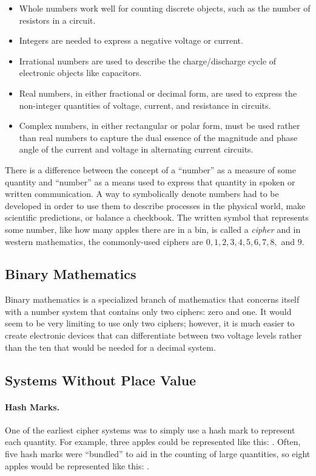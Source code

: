 \begin{itemize}
  \item Whole numbers work well for counting discrete objects, such as the number of resistors in a circuit. 
  \item Integers are needed to express a negative voltage or current. 
  \item Irrational numbers are used to describe the charge/discharge cycle of electronic objects like capacitors.
  \item Real numbers, in either fractional or decimal form, are used to express the non-integer quantities of voltage, current, and resistance in circuits.
  \item Complex numbers, in either rectangular or polar form, must be used rather than real numbers to capture the dual essence of the magnitude and phase angle of the current and voltage in alternating current circuits.
\end{itemize}

There is a difference between the concept of a ``number'' as a measure of some quantity and ``number'' as a means used to express that quantity in spoken or written communication. A way to symbolically denote numbers had to be developed in order to use them to describe processes in the physical world, make scientific predictions, or balance a checkbook. The written symbol that represents some number, like how many apples there are in a bin, is called a \emph{cipher} and in western mathematics, the commonly-used ciphers are $ 0, 1, 2, 3, 4, 5, 6, 7, 8, $ and $ 9 $.

\subsection{Binary Mathematics}
\label{MF:sub:binary_mathematics}
Binary mathematics is a specialized branch of mathematics that concerns itself with a number system that contains only two ciphers: zero and one. It would seem to be very limiting to use only two ciphers; however, it is much easier to create electronic devices that can differentiate between two voltage levels rather than the ten that would be needed for a decimal system.

\subsection{Systems Without Place Value}
\label{MF:sub:sysems_without_place_value}
\paragraph{Hash Marks.} One of the earliest cipher systems was to simply use a hash mark to represent each quantity. For example, three apples could be represented like this: \textbar \textbar \textbar. Often, five hash marks were ``bundled'' to aid in the counting of large quantities, so eight apples would be represented like this: \sout{\textbar \textbar \textbar \textbar} \textbar \textbar \textbar. 

